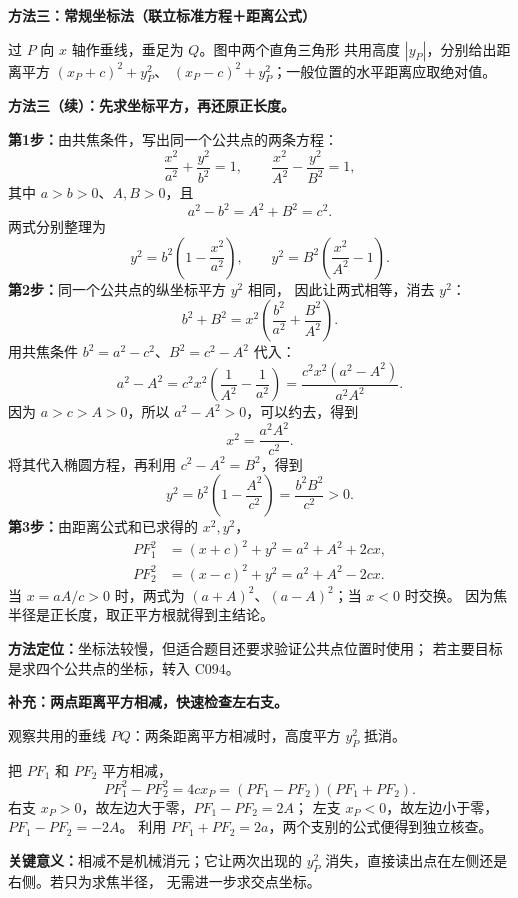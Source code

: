\clearpage
\begin{proofbox}
\textbf{方法三：常规坐标法（联立标准方程＋距离公式）}

\begin{center}

\end{center}
过 $P$ 向 $x$ 轴作垂线，垂足为 $Q$。图中两个直角三角形
共用高度 $|y_P|$，分别给出距离平方 $(x_P+c)^2+y_P^2$、
$(x_P-c)^2+y_P^2$；一般位置的水平距离应取绝对值。

\end{proofbox}
\clearpage
\begin{proofbox}
\textbf{方法三（续）：先求坐标平方，再还原正长度。}

\textbf{第1步：}由共焦条件，写出同一个公共点的两条方程：
\[
\boxed{\frac{x^2}{a^2}+\frac{y^2}{b^2}=1},\qquad
\boxed{\frac{x^2}{A^2}-\frac{y^2}{B^2}=1},
\]
其中 $a>b>0$、$A,B>0$，且
\[\boxed{a^2-b^2=A^2+B^2=c^2}.\]
两式分别整理为
\[
 y^2=b^2\left(1-\frac{x^2}{a^2}\right),\qquad
 y^2=B^2\left(\frac{x^2}{A^2}-1\right).
\]
\textbf{第2步：}同一个公共点的纵坐标平方 $y^2$ 相同，
因此让两式相等，消去 $y^2$：
\[
 b^2+B^2=x^2\left(\frac{b^2}{a^2}+\frac{B^2}{A^2}\right).
\]
用共焦条件 $b^2=a^2-c^2$、$B^2=c^2-A^2$ 代入：
\[
 a^2-A^2
 =c^2x^2\left(\frac1{A^2}-\frac1{a^2}\right)
 =\frac{c^2x^2(a^2-A^2)}{a^2A^2}.
\]
因为 $a>c>A>0$，所以 $a^2-A^2>0$，可以约去，得到
\[
\boxed{x^2=\frac{a^2A^2}{c^2}}.
\]
将其代入椭圆方程，再利用 $c^2-A^2=B^2$，得到
\[
y^2=b^2\left(1-\frac{A^2}{c^2}\right)
=\boxed{\frac{b^2B^2}{c^2}}>0.
\]
\textbf{第3步：}由距离公式和已求得的 $x^2,y^2$，
\[
\begin{aligned}
PF_1^2&=(x+c)^2+y^2=a^2+A^2+2cx,\\
PF_2^2&=(x-c)^2+y^2=a^2+A^2-2cx.
\end{aligned}
\]
当 $x=aA/c>0$ 时，两式为
$(a+A)^2$、$(a-A)^2$；当 $x<0$ 时交换。
因为焦半径是正长度，取正平方根就得到主结论。

\textbf{方法定位：}坐标法较慢，但适合题目还要求验证公共点位置时使用；
若主要目标是求四个公共点的坐标，转入 C094。
\end{proofbox}

\clearpage
\begin{proofbox}
\textbf{补充：两点距离平方相减，快速检查左右支。}

\begin{center}

\end{center}
观察共用的垂线 $PQ$：两条距离平方相减时，高度平方 $y_P^2$ 抵消。

把 $PF_1$ 和 $PF_2$ 平方相减，
\[
PF_1^2-PF_2^2=4cx_P
=(PF_1-PF_2)(PF_1+PF_2).
\]
右支 $x_P>0$，故左边大于零，$PF_1-PF_2=2A$；
左支 $x_P<0$，故左边小于零，$PF_1-PF_2=-2A$。
利用 $PF_1+PF_2=2a$，两个支别的公式便得到独立核查。

\textbf{关键意义：}相减不是机械消元；它让两次出现的 $y_P^2$
消失，直接读出点在左侧还是右侧。若只为求焦半径，
无需进一步求交点坐标。
\end{proofbox}
